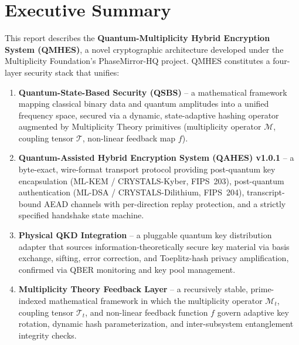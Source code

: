 \documentclass[12pt,letterpaper]{article}
\theoremstyle{plain}
\theoremstyle{definition}
\begin{document}
\tableofcontents
\newpage

\section{Executive Summary}

This report describes the \textbf{Quantum-Multiplicity Hybrid Encryption System
(QMHES)}, a novel cryptographic architecture developed under the Multiplicity
Foundation's PhaseMirror-HQ project. QMHES constitutes a four-layer security
stack that unifies:

\begin{enumerate}[leftmargin=2em]
  \item \textbf{Quantum-State-Based Security (QSBS)} -- a mathematical framework
    mapping classical binary data and quantum amplitudes into a unified frequency
    space, secured via a dynamic, state-adaptive hashing operator augmented by
    Multiplicity Theory primitives (multiplicity operator $\mathcal{M}$, coupling
    tensor $\mathcal{T}$, non-linear feedback map $f$).

  \item \textbf{Quantum-Assisted Hybrid Encryption System (QAHES) v1.0.1} -- a
    byte-exact, wire-format transport protocol providing post-quantum key
    encapsulation (ML-KEM / CRYSTALS-Kyber, FIPS~203), post-quantum
    authentication (ML-DSA / CRYSTALS-Dilithium, FIPS~204), transcript-bound
    AEAD channels with per-direction replay protection, and a strictly specified
    handshake state machine.

  \item \textbf{Physical QKD Integration} -- a pluggable quantum key distribution
    adapter that sources information-theoretically secure key material via
    basis exchange, sifting, error correction, and Toeplitz-hash privacy
    amplification, confirmed via QBER monitoring and key pool management.

  \item \textbf{Multiplicity Theory Feedback Layer} -- a recursively stable,
    prime-indexed mathematical framework in which the multiplicity operator
    $\mathcal{M}_t$, coupling tensor $\mathcal{T}_t$, and non-linear feedback
    function $f$ govern adaptive key rotation, dynamic hash parameterization, and
    inter-subsystem entanglement integrity checks.
\end{enumerate}
\end{document}
